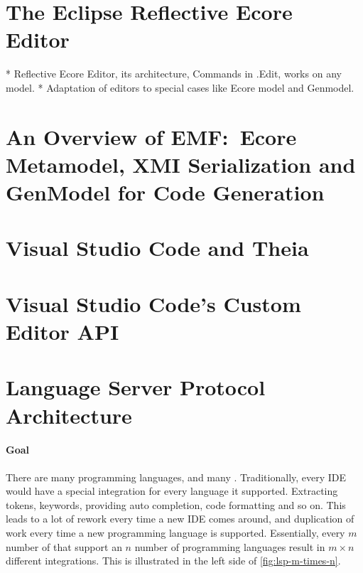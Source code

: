 \section{The Eclipse Reflective Ecore Editor}

* Reflective Ecore Editor, its architecture, Commands in .Edit, works on any model.
* Adaptation of editors to special cases like Ecore model and Genmodel.

\section{An Overview of EMF:\ Ecore Metamodel, XMI Serialization and GenModel for Code Generation}\label{sec:emf-metamodel}



\section{Visual Studio Code and Theia}




\section{Visual Studio Code's Custom Editor API}\label{sec:vscode-custom-editor}




\section{Language Server Protocol Architecture}\label{sec:lsp}

\paragraph{Goal}
There are many programming languages, and many .
Traditionally, every \acrshort{IDE} would have a special integration for every language it supported.
Extracting tokens, keywords, providing auto completion, code formatting and so on.
This leads to a lot of rework every time a new \acrshort{IDE} comes around, and duplication of work every time a new programming language is supported.
Essentially, every $m$ number of  that support an $n$ number of programming languages result in $m\times{}n$ different integrations.
This is illustrated in the left side of \cref{fig:lsp-m-times-n}.\\

